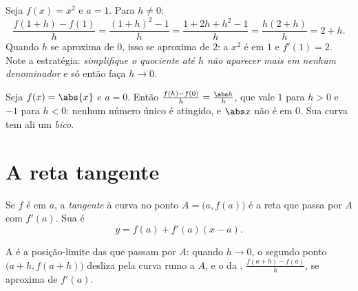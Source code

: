 \begin{example}\label{ex:g11:deriv:atpoint}
Seja $f(x) = x^2$ e $a = 1$. Para $h \neq 0$:
\[
\frac{f(1+h) - f(1)}{h}
= \frac{(1+h)^2 - 1}{h}
= \frac{1 + 2h + h^2 - 1}{h}
= \frac{h(2 + h)}{h}
= 2 + h .
\]
Quando $h$ se aproxima de $0$, isso se aproxima de $2$: a  $x^2$ é
 em $1$ e $f'(1) = 2$. Note a estratégia: \emph{simplifique o
quociente até $h$ não aparecer mais em nenhum denominador} e só então
faça $h \to 0$.
\end{example}

\begin{example}
Seja $f(x) = \abs{x}$ e $a = 0$. Então
$\frac{f(h) - f(0)}{h} = \frac{\abs h}{h}$, que vale $1$ para $h > 0$ e
$-1$ para $h < 0$: nenhum número único é atingido, e $\abs x$ não é
 em $0$. Sua curva tem ali um \emph{bico}.
\end{example}

\section{A reta tangente}

\begin{definition}[Tangente]\label{def:g11:deriv:tangent}
Se $f$ é  em $a$, a \emph{tangente} à curva no
ponto $A = \bigl(a, f(a)\bigr)$ é a reta que passa por $A$ com
 $f'(a)$. Sua  é
\[
y = f(a) + f'(a)(x - a).
\]
\end{definition}

A  é a posição-limite das  que passam por $A$: quando
$h \to 0$, o segundo ponto $\bigl(a+h, f(a+h)\bigr)$ desliza pela curva
rumo a $A$, e o  da ,
$\frac{f(a+h)-f(a)}{h}$, se aproxima de $f'(a)$.

